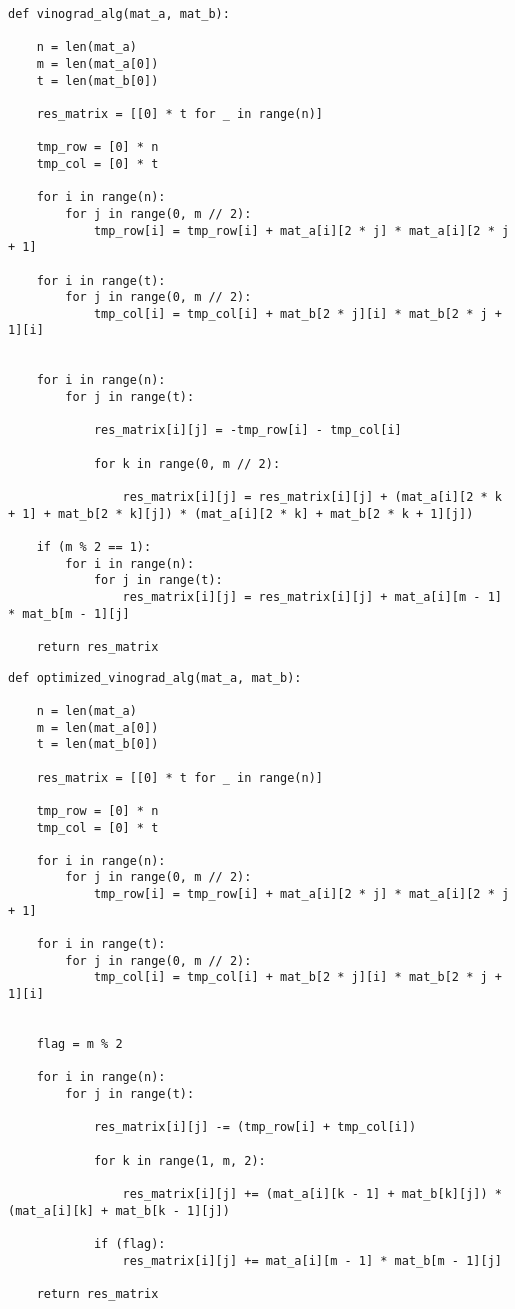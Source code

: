 \begin{center}
    \captionsetup{justification=raggedright,singlelinecheck=off}
    \begin{lstlisting}[label=lst:vin_alg,caption=Алгоритм Винограда умножения матриц]
def vinograd_alg(mat_a, mat_b):

	n = len(mat_a)
	m = len(mat_a[0])
	t = len(mat_b[0])

	res_matrix = [[0] * t for _ in range(n)]

	tmp_row = [0] * n
	tmp_col = [0] * t

	for i in range(n):
		for j in range(0, m // 2):
			tmp_row[i] = tmp_row[i] + mat_a[i][2 * j] * mat_a[i][2 * j + 1]

	for i in range(t):
		for j in range(0, m // 2):
			tmp_col[i] = tmp_col[i] + mat_b[2 * j][i] * mat_b[2 * j + 1][i] 


	for i in range(n):
		for j in range(t):

			res_matrix[i][j] = -tmp_row[i] - tmp_col[i]   

			for k in range(0, m // 2):

				res_matrix[i][j] = res_matrix[i][j] + (mat_a[i][2 * k + 1] + mat_b[2 * k][j]) * (mat_a[i][2 * k] + mat_b[2 * k + 1][j])

	if (m % 2 == 1):
		for i in range(n):
			for j in range(t):
				res_matrix[i][j] = res_matrix[i][j] + mat_a[i][m - 1] * mat_b[m - 1][j]

	return res_matrix
\end{lstlisting}
\end{center}


\begin{center}
    \captionsetup{justification=raggedright,singlelinecheck=off}
    \begin{lstlisting}[label=lst:opt_vin_alg,caption=Оптимизированный алгоритм Винограда умножения матриц]
def optimized_vinograd_alg(mat_a, mat_b):

	n = len(mat_a)
	m = len(mat_a[0])
	t = len(mat_b[0])

	res_matrix = [[0] * t for _ in range(n)]

	tmp_row = [0] * n
	tmp_col = [0] * t

	for i in range(n):
		for j in range(0, m // 2):
			tmp_row[i] = tmp_row[i] + mat_a[i][2 * j] * mat_a[i][2 * j + 1]

	for i in range(t):
		for j in range(0, m // 2):
			tmp_col[i] = tmp_col[i] + mat_b[2 * j][i] * mat_b[2 * j + 1][i]


	flag = m % 2

	for i in range(n):
		for j in range(t):

			res_matrix[i][j] -= (tmp_row[i] + tmp_col[i])

			for k in range(1, m, 2):

				res_matrix[i][j] += (mat_a[i][k - 1] + mat_b[k][j]) * (mat_a[i][k] + mat_b[k - 1][j])

			if (flag):
				res_matrix[i][j] += mat_a[i][m - 1] * mat_b[m - 1][j]

	return res_matrix
\end{lstlisting}
\end{center}


